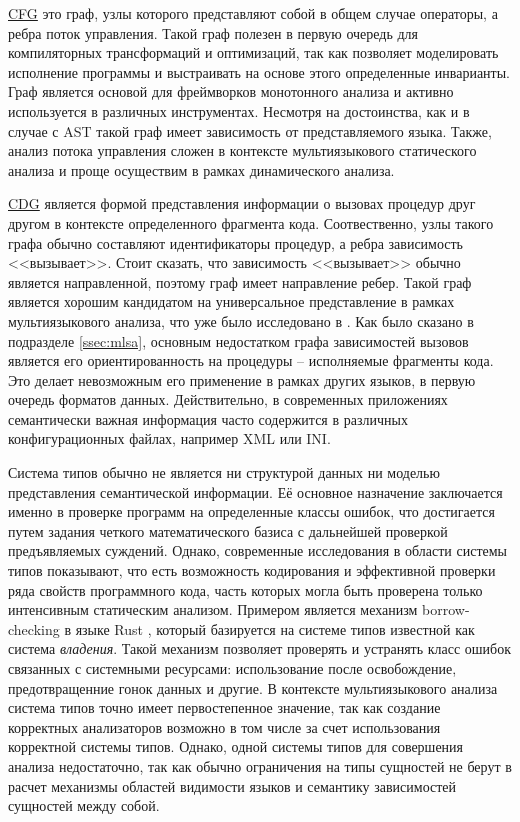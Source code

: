 \hyperlink{CFG}{CFG} это граф, узлы которого представляют собой в общем случае операторы, а ребра
поток управления. Такой граф полезен в первую очередь для компиляторных трансформаций и оптимизаций,
так как позволяет моделировать исполнение программы и выстраивать на основе этого определенные инварианты.
Граф является основой для фреймворков монотонного анализа \cite{static-program-analysis} и активно
используется в различных инструментах. Несмотря на достоинства, как и в случае с AST такой граф
имеет зависимость от представляемого языка. Также, анализ потока управления сложен в контексте
мультиязыкового статического анализа и проще осуществим в рамках динамического анализа.

\hyperlink{CDG}{CDG} является формой представления информации о вызовах процедур друг другом в контексте
определенного фрагмента кода. Соотвественно, узлы такого графа обычно составляют идентификаторы
процедур, а ребра зависимость <<вызывает>>. Стоит сказать, что зависимость <<вызывает>> обычно является
направленной, поэтому граф имеет направление ребер. Такой граф является хорошим кандидатом на универсальное
представление в рамках мультиязыкового анализа, что уже было исследовано в \cite{MLSA}. Как было
сказано в подразделе \ref{ssec:mlsa}, основным недостатком графа зависимостей вызовов является
его ориентированность на процедуры -- исполняемые фрагменты кода. Это делает невозможным его применение
в рамках других языков, в первую очередь форматов данных. Действительно, в современных приложениях
семантически важная информация часто содержится в различных конфигурационных файлах, например XML или
INI.

Система типов обычно не является ни структурой данных ни моделью представления семантической информации.
Её основное назначение заключается именно в проверке программ на определенные классы ошибок,
что достигается путем задания четкого математического базиса с дальнейшей проверкой предъявляемых
суждений. Однако, современные исследования в области системы типов показывают, что
есть возможность кодирования и эффективной проверки ряда свойств программного кода, часть
которых могла быть проверена только интенсивным статическим анализом. Примером является
механизм borrow-checking в языке Rust \cite{rust}, который базируется на системе типов известной
как система \textit{владения}. Такой механизм позволяет проверять и устранять класс ошибок связанных
с системными ресурсами: использование после освобождение, предотвращенние гонок данных и другие.
В контексте мультиязыкового анализа система типов точно имеет первостепенное значение, так
как создание корректных анализаторов возможно в том числе за счет использования корректной
системы типов. Однако, одной системы типов для совершения анализа недостаточно, так как
обычно ограничения на типы сущностей не берут в расчет механизмы областей видимости языков
и семантику зависимостей сущностей между собой.




